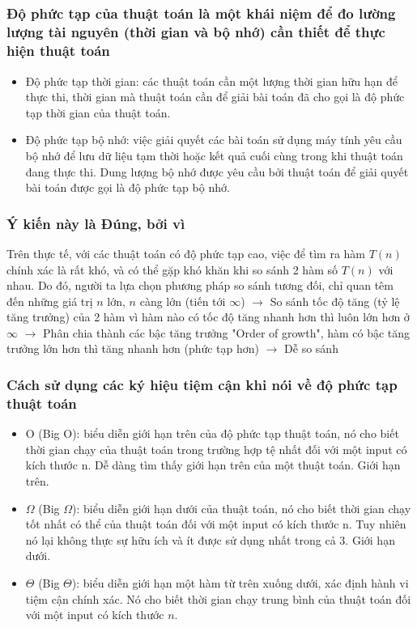 \subsection{}
\subsubsection{Độ phức tạp của thuật toán là một khái niệm để đo lường lượng tài nguyên (thời gian và bộ nhớ) cần thiết để thực hiện thuật toán}
\begin{itemize}
    \item Độ phức tạp thời gian: các thuật toán cần một lượng thời gian hữu hạn để thực thi, thời gian mà thuật toán cần để giải bài toán đã cho gọi là độ phức tạp thời gian của thuật toán. 
    \item Độ phức tạp bộ nhớ: việc giải quyết các bài toán sử dụng máy tính yêu cầu bộ nhớ để lưu dữ liệu tạm thời hoặc kết quả cuối cùng trong khi thuật toán đang thực thi. Dung lượng bộ nhớ được yêu cầu bởi thuật toán để giải quyết bài toán được gọi là độ phức tạp bộ nhớ. 
\end{itemize}
\subsubsection{Ý kiến này là Đúng, bởi vì}
Trên thực tế, với các thuật toán có độ phức tạp cao, việc để tìm ra hàm $T(n)$ chính xác là rất khó, và có thể gặp khó khăn khi so sánh 2 hàm số $T(n)$ với nhau. Do đó, người ta lựa chọn phương pháp so sánh tương đối, chỉ quan têm đến những giá trị $n$ lớn, $n$ càng lớn (tiến tới $\infty$) $\rightarrow$ So sánh tốc độ tăng (tỷ lệ tăng trưởng) của 2 hàm vì hàm nào có tốc độ tăng nhanh hơn thì luôn lớn hơn ở $\infty$ $\rightarrow$ Phân chia thành các bậc tăng trưởng "Order of growth", hàm có bậc tăng trưởng lớn hơn thì tăng nhanh hơn (phức tạp hơn) $\rightarrow$ Dễ so sánh
\subsubsection{Cách sử dụng các ký hiệu tiệm cận khi nói về độ phức tạp thuật toán}
\begin{itemize}
    \item O (Big O): biểu diễn giới hạn trên của độ phức tạp thuật toán, nó cho biết thời gian chạy của thuật toán trong trường hợp tệ nhất đối với một input có kích thước n. Dễ dàng tìm thấy giới hạn trên của một thuật toán. Giới hạn trên.
    \item $\Omega$ (Big $\Omega$): biểu diễn giới hạn dưới của thuật toán, nó cho biết thời gian chạy tốt nhất có thể của thuật toán đối với một input có kích thước n. Tuy nhiên nó lại không thực sự hữu ích và ít được sử dụng nhất trong cả 3. Giới hạn dưới.
    \item $\Theta$ (Big $\Theta$): biểu diễn giới hạn một hàm từ trên xuống dưới, xác định hành vi tiệm cận chính xác. Nó cho biết thời gian chạy trung bình của thuật toán đối với một input có kích thước $n$.
\end{itemize}


